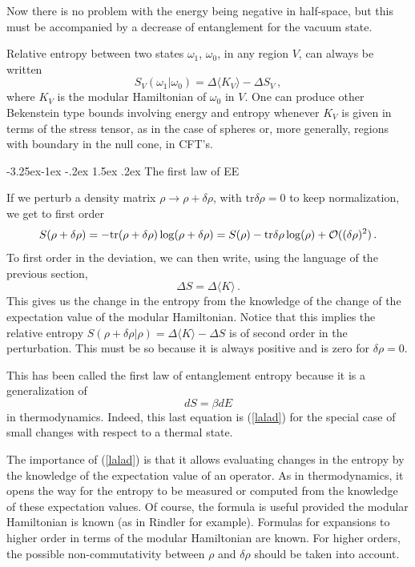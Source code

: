 \documentclass[11pt,a4paper]{article}
\makeatletter
\renewcommand\subsection{\@startsection{subsection}{2}{\z@}%
                                   {-3.25ex\@plus -1ex \@minus -.2ex}%
                                     {1.5ex \@plus .2ex}%
                                     {\normalfont\bfseries}}
\numberwithin{equation}{section}
\newcommand{\be}{\begin{equation}}
\newcommand{\ee}{\end{equation}}
\makeatother
\begin{document}
Now there is no problem with the energy being negative in half-space, but this must be accompanied by a decrease of entanglement for the vacuum state.  

Relative entropy between two states $\omega_1$, $\omega_0$, in any region $V$, can always be written 
\be
S_V(\omega_1|\omega_0)=\Delta \langle K_V \rangle - \Delta S_V\,,
\ee
where $K_V$ is the modular Hamiltonian of $\omega_0$ in $V$. One can produce other Bekenstein type bounds involving energy and entropy whenever $K_V$ is given in terms of the stress tensor, as in the case of spheres or, more generally, regions with boundary in the null cone, in CFT's. 


\subsection{The first law of EE}

If we perturb a density matrix $\rho \rightarrow \rho+\delta \rho$, with $\textrm{tr} \delta \rho=0$ to keep normalization, we get to first order
\be
S(\rho+\delta\rho)= - \textrm{tr}  (\rho+\delta\rho) \log(\rho+\delta\rho)
=S(\rho)- \textrm{tr}  \delta\rho \log(\rho)+{\cal O}((\delta \rho)^2)\,.
\ee
To first order in the deviation, we can then write, using the language of the previous section, 
\be
\Delta S=\Delta \langle K\rangle\,.\label{lalad}
\ee
This gives us the change in the entropy from the knowledge of the change of the expectation value of the modular Hamiltonian. Notice that this implies the relative entropy $S(\rho+\delta \rho |\rho)=\Delta \langle K \rangle-\Delta S$ is of second order in the perturbation. This must be so because it is always positive and is zero for $\delta \rho=0$.

This has been called the first law of entanglement entropy because it is a generalization of 
\be
dS=\beta dE
\ee
in thermodynamics. Indeed, this last equation is (\ref{lalad}) for the special case of small changes with respect to a thermal state.    

The importance of (\ref{lalad}) is that it allows evaluating changes in the entropy by the knowledge of the expectation value of an operator. As in thermodynamics, it opens the way for the entropy to be measured or computed from the knowledge of these expectation values. Of course, the formula is useful provided the modular Hamiltonian is known (as in Rindler for example). Formulas for expansions to higher order in terms of the modular Hamiltonian are known. For higher orders, the possible non-commutativity between $\rho$ and $\delta \rho$ should be taken into account.  
\end{document}
